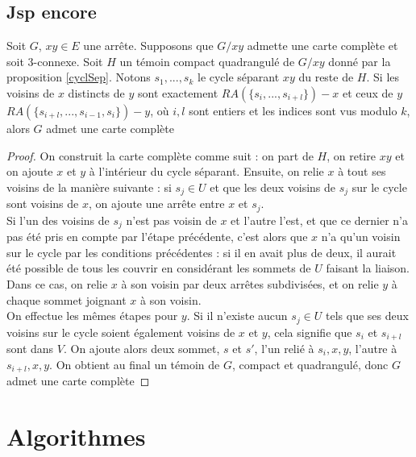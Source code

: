 \documentclass{scrartcl}
\begin{document}
\begin{flushleft}
\subsection{Jsp encore}

\begin{prop}\label{ezDecontr}
    Soit $G$, $xy \in E$ une arrête. Supposons que $G / xy$ admette une carte complète et soit $3$-connexe. Soit $H$ un témoin compact
    quadrangulé de $G / xy$ donné par la proposition \ref{cyclSep}. Notons $s_1, ..., s_k$ le cycle séparant $xy$ du reste de $H$.
    Si les voisins de $x$ distincts de $y$ sont exactement $RA(\{s_i, ..., s_{i+l}\}) - x$ et ceux de $y$
    $RA(\{s_{i+l}, ..., s_{i-1}, s_i\}) - y$,
    où $i, l$ sont entiers et les indices sont vus modulo $k$, alors $G$ admet une carte complète
\end{prop}

\begin{proof}
    On construit la carte complète comme suit : on part de $H$, on retire $xy$ et on ajoute $x$ et $y$ à l'intérieur du cycle séparant.
    Ensuite, on relie $x$ à tout ses voisins de la manière suivante : si $s_j \in U$ et que les deux voisins de $s_j$ sur le cycle
    sont voisins de $x$, on ajoute une arrête entre $x$ et $s_j$.\\
    Si l'un des voisins de $s_j$ n'est pas voisin de $x$ et l'autre l'est,
    et que ce dernier n'a pas été pris en compte par l'étape précédente, c'est alors que $x$ n'a qu'un voisin sur le cycle par
    les conditions précédentes : si il en avait plus de deux, il aurait été possible de tous les couvrir en considérant les sommets
    de $U$ faisant la liaison. Dans ce cas, on relie $x$ à son voisin par deux arrêtes subdivisées, et on relie $y$ à chaque sommet
    joignant $x$ à son voisin.\\
    On effectue les mêmes étapes pour $y$. Si il n'existe aucun $s_j \in U$ tels que ses deux voisins sur le cycle soient également
    voisins de $x$ et $y$, cela signifie que $s_i$ et $s_{i+l}$ sont dans $V$. On ajoute alors deux sommet, $s$ et $s'$, l'un relié
    à $s_i, x, y$, l'autre à $s_{i+l}, x, y$. On obtient au final un témoin de $G$, compact et quadrangulé, donc $G$ admet une carte
    complète
\end{proof}

\section{Algorithmes}


\end{flushleft}
\end{document}
